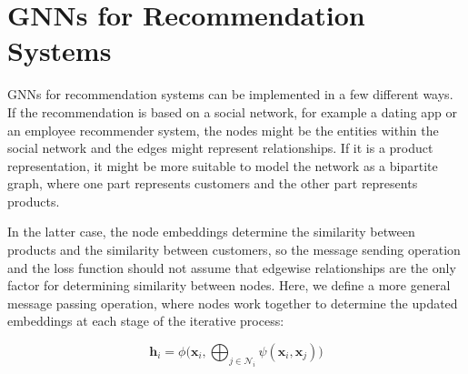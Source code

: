 \documentclass[final]{article}
\begin{document}
\begin{comment}
For node classification and graph classification tasks, the cross-entropy loss function is often used. The cross-entropy loss measures the difference between the predicted probability distribution over the possible labels and the true label distribution for each node. 

For node classification, the cross-entropy loss is calculated as:

$$L=-\sum_{i=1}^{n} \sum_{j=1}^{C} y_{ij} \log \hat{y}_{ij}$$

where $n$ is the number of nodes, $C$ is the number of classes, $y_{ij}$ is the ground truth label of node $i$ for class $j$, and $\hat{y}_{ij}$ is the predicted probability of node $i$ belonging to class $j$.

For graph classification, the cross-entropy loss is calculated similarly:

$$L=-\sum_{i=1}^{m} y_{i} \log \hat{y}_{i}$$

where $m$ is the number of graphs, $y_{i}$ is the ground truth label of graph $i$, and $\hat{y}_{i}$ is the predicted probability of graph $i$ belonging to its true class.
\end{comment}


\section{GNNs for Recommendation Systems} 

GNNs for recommendation systems can be implemented in a few different ways. If the recommendation is based on a social network, for example a dating app or an employee recommender system, the nodes might be the entities within the social network and the edges might represent relationships. If it is a product representation, it might be more suitable to model the network as a bipartite graph, where one part represents customers and the other part represents products. \cite{cs224w_gnn_recommender}

In the latter case, the node embeddings determine the similarity between products and the similarity between customers, so the message sending operation and the loss function should not assume that edgewise relationships are the only factor for determining similarity between nodes. Here, we define a more general message passing operation, where nodes work together to determine the updated embeddings at each stage of the iterative process: 

$$\textbf{h}_i = \phi \bigg( \textbf{x}_i, \bigoplus_{j \in \mathcal{N}_i} \psi (\textbf{x}_i, {\textbf{x}}_j)\bigg)$$
\end{document}
